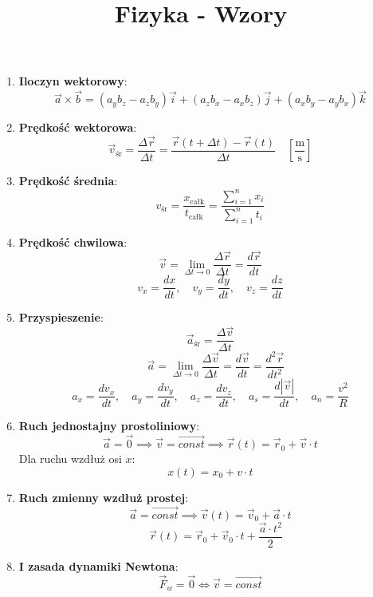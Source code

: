 \documentclass{article}
\author{}
\title{Fizyka - Wzory}
\date{}
\begin{document}
	\maketitle
	
	\begin{enumerate}
		
		\item \textbf{Iloczyn wektorowy}:
		\[
		\vec{a} \times \vec{b} = (a_yb_z - a_zb_y)\vec{i} + (a_zb_x - a_xb_z)\vec{j} + (a_xb_y - a_yb_x)\vec{k}
		\]
		
		\item \textbf{Prędkość wektorowa}:
		\[
		\vec{v}_\text{śr} = \frac{\Delta\vec{r}}{\Delta t} = \frac{\vec{r}(t + \Delta t) - \vec{r}(t)}{\Delta t} \quad \left[\frac{\text{m}}{\text{s}}\right]
		\]
		
		\item \textbf{Prędkość średnia}:
		\[
		v_\text{śr} = \frac{x_\text{całk}}{t_\text{całk}} = \frac{\sum \limits_{i=1}^{n}x_i}{\sum \limits_{i=1}^{n}t_i}
		\]
		
		\item \textbf{Prędkość chwilowa}:
		\[
		\vec{v} = \lim_{\Delta t \to 0} \frac{\Delta \vec{r}}{\Delta t} = \frac{d \vec{r}}{dt}
		\]
		\[
		v_x = \frac{dx}{dt}, \quad v_y = \frac{dy}{dt}, \quad v_z = \frac{dz}{dt}
		\]
		
		\item \textbf{Przyspieszenie}:
		\[
		\vec{a}_\text{śr} = \frac{\Delta \vec{v}}{\Delta t}
		\]
		\[
		\quad 
		\vec{a} = \lim_{\Delta t \to 0} \frac{\Delta \vec{v}}{\Delta t} = \frac{d \vec{v}}{dt} = \frac{d^2 \vec{r}}{dt^2}
		\]
		\[
		a_x = \frac{dv_x}{dt}, \quad a_y = \frac{dv_y}{dt}, \quad a_z = \frac{dv_z}{dt}, \quad a_s = \frac{d|\vec{v}|}{dt}, \quad a_n = \frac{v^2}{R}
		\]
		
		\item \textbf{Ruch jednostajny prostoliniowy}:
		\[
		\vec{a} = \vec{0} \implies \vec{v} = \overrightarrow{const} \implies \vec{r}(t) = \vec{r}_0 + \vec{v} \cdot t
		\]
		Dla ruchu wzdłuż osi \(x\):
		\[
		x(t) = x_0 + v \cdot t
		\]
		
		\item \textbf{Ruch zmienny wzdłuż prostej}:
		\[
		\vec{a} = \overrightarrow{const} \implies \vec{v}(t) = \vec{v}_0 + \vec{a} \cdot t
		\]
		\[\quad \vec{r}(t) = \vec{r}_0 + \vec{v}_0 \cdot t + \frac{\vec{a} \cdot t^2}{2}
		\]
		
		\item \textbf{I zasada dynamiki Newtona}:
		\[
		\vec{F}_w = \vec{0} \iff \vec{v} = \overrightarrow{const}
		\]
		

\end{enumerate}
\end{document}
